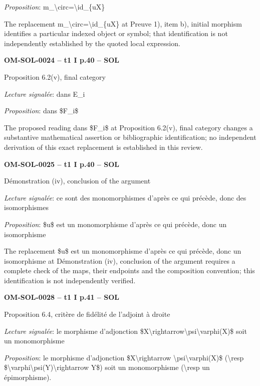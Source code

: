 \emph{Proposition}: m\_\textbackslash{}circ=\allowbreak \textbackslash{}id\_\{uX\}\par
The replacement m\_\textbackslash{}circ=\allowbreak \textbackslash{}id\_\{uX\} at Preuve 1), item b), initial morphism identifies a particular indexed object or symbol; that identification is not independently established by the quoted local expression.\par
\par\noindent\textbf{OM-SOL-0024 -- t1 I p.40 -- SOL}\par
Proposition 6.2(v), final category\par
\emph{Lecture signalée}: dans E\_i\par
\emph{Proposition}: dans \$F\_i\$\par
The proposed reading dans \$F\_i\$ at Proposition 6.2(v), final category changes a substantive mathematical assertion or bibliographic identification; no independent derivation of this exact replacement is established in this review.\par
\par\noindent\textbf{OM-SOL-0025 -- t1 I p.40 -- SOL}\par
Démonstration (iv), conclusion of the argument\par
\emph{Lecture signalée}: ce sont des monomorphismes d'après ce qui précède, donc des isomorphismes\par
\emph{Proposition}: \$u\$ est un monomorphisme d'après ce qui précède, donc un isomorphisme\par
The replacement \$u\$ est un monomorphisme d'après ce qui précède, donc un isomorphisme at Démonstration (iv), conclusion of the argument requires a complete check of the maps, their endpoints and the composition convention; this identification is not independently verified.\par
\par\noindent\textbf{OM-SOL-0028 -- t1 I p.41 -- SOL}\par
Proposition 6.4, critère de fidélité de l'adjoint à droite\par
\emph{Lecture signalée}: le morphisme d'adjonction \$X\textbackslash{}rightarrow\textbackslash{}psi\textbackslash{}varphi(X)\$ soit un monomorphisme\par
\emph{Proposition}: le morphisme d'adjonction \$X\textbackslash{}rightarrow \textbackslash{}psi\textbackslash{}varphi(X)\$ (\textbackslash{}resp \$\textbackslash{}varphi\textbackslash{}psi(Y)\textbackslash{}rightarrow Y\$) soit un monomorphisme (\textbackslash{}resp un épimorphisme).\par
